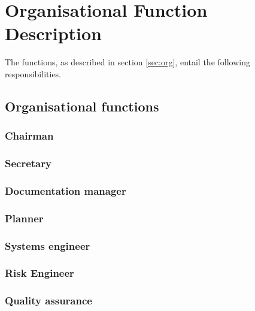 \section{Organisational Function Description} \label{app:obs}
The functions, as described in section \ref{sec:org}, entail the following responsibilities.

\subsection{Organisational functions}
\subsubsection{Chairman}\label{subsec:Chairman}


\subsubsection{Secretary}\label{subsec:Secretary}


\subsubsection{Documentation manager}\label{subsec:D_and_A}


\subsubsection{Planner}\label{subsec:Planner}


\subsubsection{Systems engineer}\label{subsec:SE}


\subsubsection{Risk Engineer}\label{subsec:RiskEng}


\subsubsection{Quality assurance}\label{subsec:QA}



